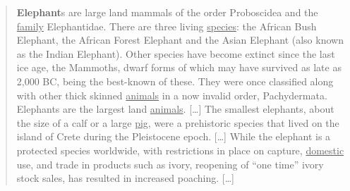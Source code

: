 \begin{quote}
\textbf{Elephant}s are large land mammals of the order Proboscidea and the \underline{family} Elephantidae. There are three living \underline{species}: the African Bush Elephant, the African Forest Elephant and the Asian Elephant (also known as the Indian Elephant). Other species have become extinct since the last ice age, the Mammoths, dwarf forms of which may have survived as late as 2,000 BC, being the best-known of these.
They were once classified along with other thick skinned \underline{animals} in a now invalid order, Pachydermata. Elephants are the largest land \underline{animals}. 
[\ldots]
The smallest elephants, about the size of a calf or a large \underline{pig}, were a prehistoric species that lived on the island of Crete during the Pleistocene epoch.
[\ldots]
While the elephant is a protected species worldwide, with restrictions in place on capture, \underline{domestic} use, and trade in products such as ivory, reopening of "`one time"' ivory stock sales, has resulted in increased poaching.
[\ldots]

\end{quote}

